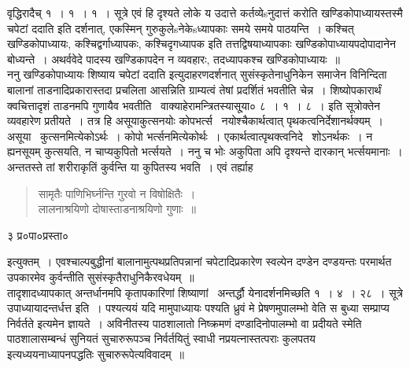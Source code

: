 \documentclass[11pt, openany]{book}
\begin{document}
वृद्धिरादैच् १~। १~। १~। सूत्रे {\qt एवं हि दृश्यते लोके य उदात्ते कर्तव्येsनुदात्तं करोति खण्डिकोपाध्यायस्तस्मै चपेटां ददाति} इति दर्शनात्, एकस्मिन् गुरुकुलेsनेकेsध्यापकाः समये समये पाठयन्ति~। कश्चित् खण्डिकोपाध्यायः, कश्चिद्वर्गाध्यापकः, कश्चिदृगध्यापक इति तत्तद्विषयाध्यापकाः खण्डिकोपाध्यायपदोपादानेन बोध्यन्ते~। अथर्ववेदे पादस्य खण्डिकापदेन न व्यवहारः, तदध्यापकश्च खण्डिकोपाध्यायः~॥\\

ननु {\qt खण्डिकोपाध्यायः शिष्याय चपेटां ददाति} इत्युदाहरणदर्शनात् सुसंस्कृतेनाधुनिकेन समाजेन विनिन्दिता बालानां ताडनादिप्रकारास्तदा प्रचलिता आसन्निति ग्राम्यत्वं तेषां प्रदर्शितं भवतीति चेन्न~। शिष्योपकारार्थं क्वचित्तादृशं ताडनमपि गुणायैव भवतीति \textendash\ वाक्याहेरामन्त्रितस्यासू्या० ८~। १~। ८~। इति सूत्रोक्तेन व्यवहारेण प्रतीयते~। तत्र हि {\qt असूयाकुत्सनयोः कोपभर्त्स} \textendash\ नयोश्चैकार्थत्वात् पृथकत्वनिर्देशानर्थक्यम्~। असूया \textendash\ कुत्सनमित्येकोऽर्थः~। कोपो भर्त्सनमित्येकोर्थः~। एकार्थत्वात्पृथक्त्वनिदे \textendash\ शोऽनर्थकः~। न ह्यनसूयम् कुत्सयति, न चाप्यकुपितो भर्त्सयते~। ननु च भोः अकुपिता अपि दृश्यन्ते दारकान् भर्त्सयमानाः~। अन्ततस्ते तां शरीराकृतिं कुर्वन्ति या कुपितस्य भवति~। एवं तर्ह्याह

\begin{quote}
{\qt सामृतैः पाणिभिर्घ्नन्ति गुरवो न विषोक्षितैः~।\\
लालनाश्रयिणो दोषास्ताडनाश्रयिणो गुणाः~॥}
\end{quote}

३ प्र०पा०प्रस्ता० 

\newpage

इत्युक्तम्~। एवश्चाल्पबुद्धीनां बालानामुत्पथप्रतिपन्नानां चपेटादिप्रकारेण स्वल्पेन दण्डेन दण्डयन्तः परमार्थत उपकारमेव कुर्वन्तीति सुसंस्कृतैराधुनिकैरवधेयम्~॥\\

तादृशादध्यापकात् अन्तर्धानमपि कृतापकारिणां शिष्याणां \textendash\ अन्तर्द्धौ येनादर्शनमिच्छति १~। ४~। २८~। सूत्रे {\qt उपाध्यायादन्तर्धत्त इति~।} पश्यत्ययं यदि मामुपाध्यायः पश्यति ध्रुवं मे प्रेषणमुपालम्भो वेति स बुध्या सम्प्राप्य निर्वर्तते इत्यमेन ज्ञायते~। अविनीतस्य पाठशालातो निष्क्रमणं दण्डादिनोपालम्भो वा प्रदीयते स्मेति पाठशालासम्बन्धं सुनियतं सुचारुरूपञ्च निर्वर्तयितुं स्वाधी नप्रयत्नास्तत्पराः कुलपतय इत्यध्ययनाध्यापनपद्धतिः सुचारुरूपेत्यविवादम्~॥\\
\end{document}
